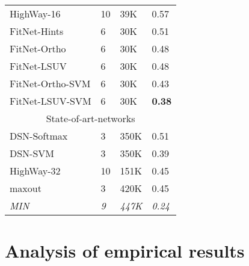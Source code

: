 \documentclass{article} \clearpage{}\usepackage{iclr2016_conference,times}
\begin{document}
\begin{table}[htb]
\begin{tabular}{llll}
\hline
HighWay-16 & 10 & 39K & 0.57  \\
FitNet-Hints & 6 &30K & 0.51\\
FitNet-Ortho & 6 &30K & 0.48\\
FitNet-LSUV & 6 &30K & 0.48\\
FitNet-Ortho-SVM & 6 &30K & 0.43\\
FitNet-LSUV-SVM & 6 &30K & \textbf{0.38}\\
\hline
\multicolumn{4}{c}{State-of-art-networks}\\
\hline
DSN-Softmax & 3 & 350K & 0.51  \\
DSN-SVM & 3 & 350K & 0.39  \\
HighWay-32 & 10 & 151K & 0.45  \\
maxout & 3 & 420K & 0.45  \\
\textit{MIN}~\footnotemark &\textit{9} & \textit{447K} &  \textit{0.24}  \\
\hline
\end{tabular}
\end{table}
\section{Analysis of empirical results}
\label{sec:solver-times-inits}
\end{document}
